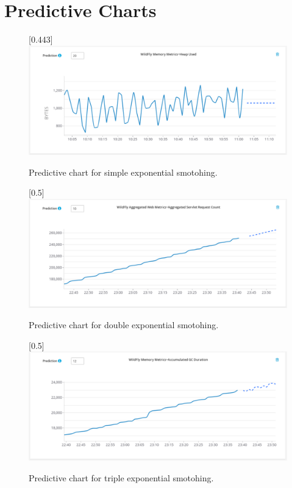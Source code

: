 \chapter{Predictive Charts}
    \begin{figure}[H]
        \begin{center}
            \scalebox{0.6}[0.443]{\includegraphics[angle=90]{img/hawkular-simple.pdf}}
            \caption{Predictive chart for simple exponential smotohing.}
            \label{appen:hawkular-simple}
        \end{center}
    \end{figure}
    \begin{figure}[H]
        \begin{center}
            \scalebox{0.6}[0.5]{\includegraphics[angle=90]{img/hawkular-double.pdf}}
            \caption{Predictive chart for double exponential smotohing.}
            \label{appen:hawkular-double}
        \end{center}
    \end{figure}
    \begin{figure}[H]
        \begin{center}
            \scalebox{0.6}[0.5]{\includegraphics[angle=90]{img/hawkular-triple.pdf}}
            \caption{Predictive chart for triple exponential smotohing.}
            \label{appen:hawkular-triple}
        \end{center}
    \end{figure}

